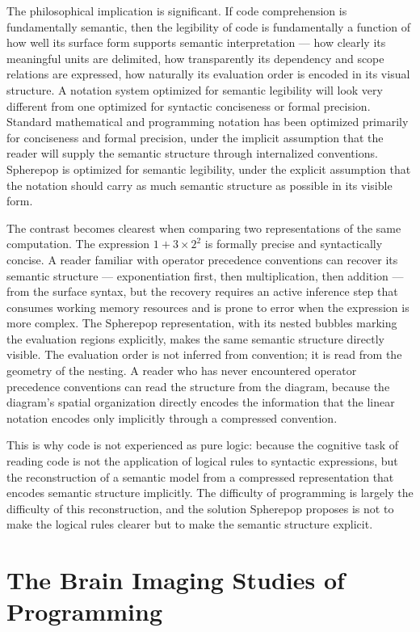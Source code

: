 \documentclass[12pt,openany]{book}
\theoremstyle{plain}
\theoremstyle{definition}
\theoremstyle{remark}
\begin{document}
The philosophical implication is significant. If code comprehension is fundamentally semantic, then the legibility of code is fundamentally a function of how well its surface form supports semantic interpretation — how clearly its meaningful units are delimited, how transparently its dependency and scope relations are expressed, how naturally its evaluation order is encoded in its visual structure. A notation system optimized for semantic legibility will look very different from one optimized for syntactic conciseness or formal precision. Standard mathematical and programming notation has been optimized primarily for conciseness and formal precision, under the implicit assumption that the reader will supply the semantic structure through internalized conventions. Spherepop is optimized for semantic legibility, under the explicit assumption that the notation should carry as much semantic structure as possible in its visible form.

The contrast becomes clearest when comparing two representations of the same computation. The expression $1 + 3 \times 2^2$ is formally precise and syntactically concise. A reader familiar with operator precedence conventions can recover its semantic structure — exponentiation first, then multiplication, then addition — from the surface syntax, but the recovery requires an active inference step that consumes working memory resources and is prone to error when the expression is more complex. The Spherepop representation, with its nested bubbles marking the evaluation regions explicitly, makes the same semantic structure directly visible. The evaluation order is not inferred from convention; it is read from the geometry of the nesting. A reader who has never encountered operator precedence conventions can read the structure from the diagram, because the diagram's spatial organization directly encodes the information that the linear notation encodes only implicitly through a compressed convention.

This is why code is not experienced as pure logic: because the cognitive task of reading code is not the application of logical rules to syntactic expressions, but the reconstruction of a semantic model from a compressed representation that encodes semantic structure implicitly. The difficulty of programming is largely the difficulty of this reconstruction, and the solution Spherepop proposes is not to make the logical rules clearer but to make the semantic structure explicit.

\section{The Brain Imaging Studies of Programming}
\end{document}
